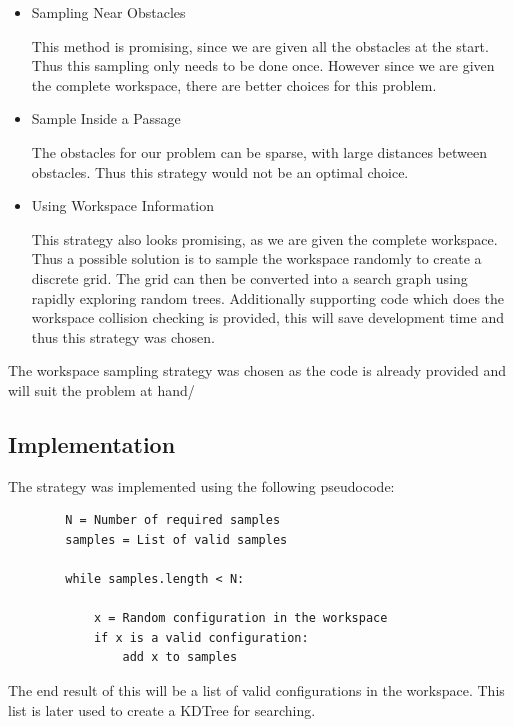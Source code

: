 \documentclass[12pt]{article}
\begin{document}
    \begin{itemize}
        \item Sampling Near Obstacles
        
            This method is promising, since we are given all the obstacles at the start. Thus this sampling only needs to be done once. However since we are given the complete workspace, there are better choices for this problem.

        \item Sample Inside a Passage

            The obstacles for our problem can be sparse, with large distances between obstacles. Thus this strategy would not be an optimal choice.

        \item Using Workspace Information

            This strategy also looks promising, as we are given the complete workspace. Thus a possible solution is to sample the workspace randomly to create a discrete grid. The grid can then be converted into a search graph using rapidly exploring random trees. Additionally supporting code which does the workspace collision checking is provided, this will save development time and thus this strategy was chosen.
    \end{itemize}

    The workspace sampling strategy was chosen as the code is already provided and will suit the problem at hand/

    \subsection{Implementation}

    The strategy was implemented using the following pseudocode:

    \begin{lstlisting}
        N = Number of required samples
        samples = List of valid samples

        while samples.length < N:
            
            x = Random configuration in the workspace
            if x is a valid configuration:
                add x to samples

    \end{lstlisting}

    The end result of this will be a list of valid configurations in the workspace. This list is later used to create a KDTree for searching.
\end{document}
